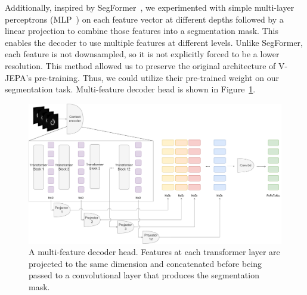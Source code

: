 \documentclass[a4paper,11pt,oneside]{report}
\begin{document}
Additionally, inspired by SegFormer~\cite{Xie2021SegFormer}, we experimented with simple multi-layer perceptrons (MLP~\cite{Rumelhart1986}) on each feature vector at different depths followed by a linear projection to combine those features into a segmentation mask. This enables the decoder to use multiple features at different levels. Unlike SegFormer, each feature is not downsampled, so it is not explicitly forced to be a lower resolution. This method allowed us to preserve the original architecture of V-JEPA's pre-training. Thus, we could utilize their pre-trained weight on our segmentation task. Multi-feature decoder head is shown in Figure~\ref{fig:vjepa-multi-feature-decoder-head}.

\begin{figure}[ht]
    \centering
    \includegraphics[width=1.0\linewidth]{figures/fig_implementation_vjepa_multifeat.pdf}
    \caption{A multi-feature decoder head. Features at each transformer layer are projected to the same dimension and concatenated before being passed to a convolutional layer that produces the segmentation mask.}
    \label{fig:vjepa-multi-feature-decoder-head}
\end{figure}
\end{document}
